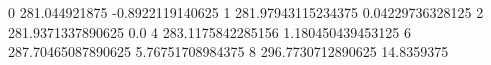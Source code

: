 0 281.044921875 -0.8922119140625
1 281.97943115234375 0.04229736328125
2 281.9371337890625 0.0
4 283.1175842285156 1.180450439453125
6 287.70465087890625 5.76751708984375
8 296.7730712890625 14.8359375
